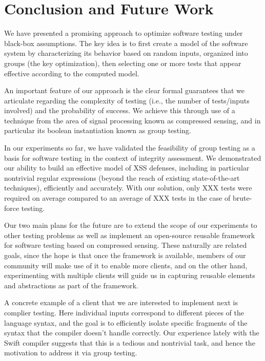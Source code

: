 \section{Conclusion and Future Work}

We have presented a promising approach to optimize software testing under black-box assumptions. The key idea is to first create a model of the software system by characterizing its behavior based on random inputs, organized into groups (the key optimization), then selecting one or more tests that appear effective according to the computed model.

An important feature of our approach is the clear formal guarantees that we articulate regarding the complexity of testing (i.e., the number of tests/inputs involved) and the probability of success. We achieve this through use of a technique from the area of signal processing known as compressed sensing, and in particular its boolean instantiation known as group testing.

In our experiments so far, we have validated the feasibility of group testing as a basis for software testing in the context of integrity assessment. We demonstrated our ability to build an effective model of XSS defenses, including in particular nontrivial regular expressions (beyond the reach of existing state-of-the-art techniques), efficiently and accurately. With our solution, only XXX tests were required on average compared to an average of XXX tests in the case of brute-force testing.

Our two main plans for the future are to extend the scope of our experiments to other testing problems as well as implement an open-source reusable framework for software testing based on compressed sensing. These naturally are related goals, since the hope is that once the framework is available, members of our community will make use of it to enable more clients, and on the other hand, experimenting with multiple clients will guide us in capturing reusable elements and abstractions as part of the framework.

A concrete example of a client that we are interested to implement next is complier testing. Here individual inputs correspond to different pieces of the language syntax, and the goal is to efficiently isolate specific fragments of the syntax that the compiler doesn't handle correctly. Our experience lately with the Swift compiler suggests that this is a tedious and nontrivial task, and hence the motivation to address it via group testing.
